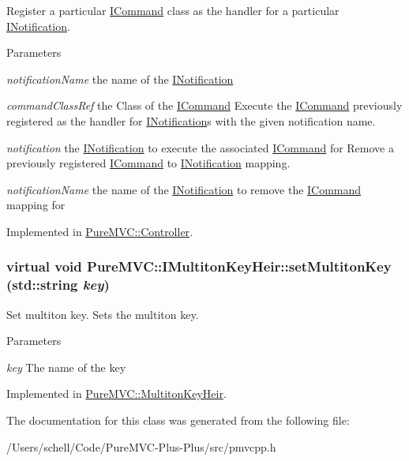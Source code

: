 Register a particular {\ttfamily \hyperlink{class_pure_m_v_c_1_1_i_command}{ICommand}} class as the handler for a particular {\ttfamily \hyperlink{class_pure_m_v_c_1_1_i_notification}{INotification}}. 
\begin{DoxyParams}{Parameters}
\item[{\em notificationName}]the name of the {\ttfamily \hyperlink{class_pure_m_v_c_1_1_i_notification}{INotification}} \item[{\em commandClassRef}]the Class of the {\ttfamily \hyperlink{class_pure_m_v_c_1_1_i_command}{ICommand}} Execute the {\ttfamily \hyperlink{class_pure_m_v_c_1_1_i_command}{ICommand}} previously registered as the handler for {\ttfamily \hyperlink{class_pure_m_v_c_1_1_i_notification}{INotification}}s with the given notification name.\item[{\em notification}]the {\ttfamily \hyperlink{class_pure_m_v_c_1_1_i_notification}{INotification}} to execute the associated {\ttfamily \hyperlink{class_pure_m_v_c_1_1_i_command}{ICommand}} for Remove a previously registered {\ttfamily \hyperlink{class_pure_m_v_c_1_1_i_command}{ICommand}} to {\ttfamily \hyperlink{class_pure_m_v_c_1_1_i_notification}{INotification}} mapping.\item[{\em notificationName}]the name of the {\ttfamily \hyperlink{class_pure_m_v_c_1_1_i_notification}{INotification}} to remove the {\ttfamily \hyperlink{class_pure_m_v_c_1_1_i_command}{ICommand}} mapping for \end{DoxyParams}


Implemented in \hyperlink{class_pure_m_v_c_1_1_controller_a3d6617b86454aad7db4d47d32e692c64}{PureMVC::Controller}.\hypertarget{class_pure_m_v_c_1_1_i_multiton_key_heir_a03acb75ab79defba2c28b8de1bbe1ca6}{
\subsubsection[{setMultitonKey}]{\setlength{\rightskip}{0pt plus 5cm}virtual void PureMVC::IMultitonKeyHeir::setMultitonKey (std::string {\em key})}}
\label{class_pure_m_v_c_1_1_i_multiton_key_heir_a03acb75ab79defba2c28b8de1bbe1ca6}


Set multiton key. Sets the multiton key. 
\begin{DoxyParams}{Parameters}
\item[{\em key}]The name of the key \end{DoxyParams}


Implemented in \hyperlink{class_pure_m_v_c_1_1_multiton_key_heir_abc70ef7c066bc8d7bf0196ec727599bb}{PureMVC::MultitonKeyHeir}.

The documentation for this class was generated from the following file:\begin{DoxyCompactItemize}
\item 
/Users/schell/Code/PureMVC-\/Plus-\/Plus/src/pmvcpp.h\end{DoxyCompactItemize}
